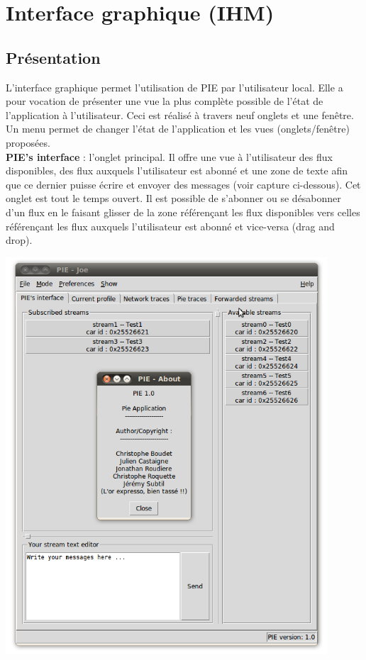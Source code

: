 
\section{Interface graphique (IHM)}
\label{section:ihm}

\subsection{Présentation}

L'interface graphique permet l'utilisation de PIE par l'utilisateur local. Elle a pour vocation
de présenter une vue la plus complète possible de l'état de l'application à l'utilisateur. Ceci
est réalisé à travers neuf onglets et une fenêtre. Un menu permet de changer l'état de l'application
et les vues (onglets/fenêtre) proposées. \\

\textbf{PIE's interface} : l'onglet principal. Il offre une vue à l'utilisateur des flux disponibles,
des flux auxquels l'utilisateur est abonné et une zone de texte afin que ce dernier puisse écrire et
envoyer des messages (voir capture ci-dessous). Cet onglet est tout le temps ouvert. Il est possible
de s'abonner ou se désabonner d'un flux en le faisant glisser de la zone référençant les flux disponibles
vers celles référençant les flux auxquels l'utilisateur est abonné et vice-versa (drag and drop).\\

\begin{center}
    \includegraphics[width=0.9\textwidth]{img/pie-main.png}
\end{center}

